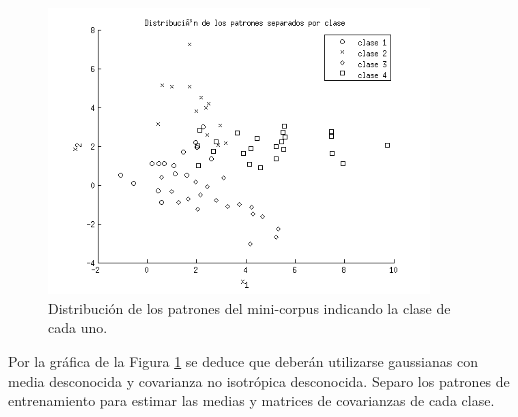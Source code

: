 \documentclass[11pt,a4paper,final]{article}
\begin{document}
\begin{figure}
\includegraphics [width=0.9\textwidth]{Ejercicio2_01.png}
\caption{Distribución de los patrones del mini-corpus indicando la clase de cada uno.}
\label{fig:ejercicio231}
\end{figure}


Por la gráfica de la Figura \ref{fig:ejercicio231} se deduce que deberán utilizarse gaussianas con media desconocida y covarianza no isotrópica desconocida. Separo los patrones de entrenamiento para estimar las medias y matrices de covarianzas de cada clase.
\end{document}
